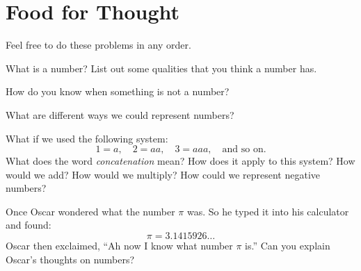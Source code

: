 \newpage
\section{Food for Thought}	

Feel free to do these problems in any order.

\begin{prob}
What is a number? List out some qualities that you think a number has.
\end{prob}

\begin{prob}
How do you know when something is not a number?
\end{prob}

\begin{prob}
What are different ways we could represent numbers? 
\end{prob}

\begin{prob}
What if we used the following system:
\[
1 = a, \quad 2 = aa, \quad 3 = aaa, \quad\text{and so on.}
\]
What does the word \textit{concatenation} mean? How does it apply to
this system?  How would we add? How would we multiply? How could we
represent negative numbers?
\end{prob}


\begin{prob}
Once Oscar wondered what the number $\pi$ was. So he typed it into his
calculator and found:
\[
\pi = 3.1415926\dots
\]
Oscar then exclaimed, ``Ah now I know what number $\pi$ is.'' Can you
explain Oscar's thoughts on numbers?
\end{prob}
